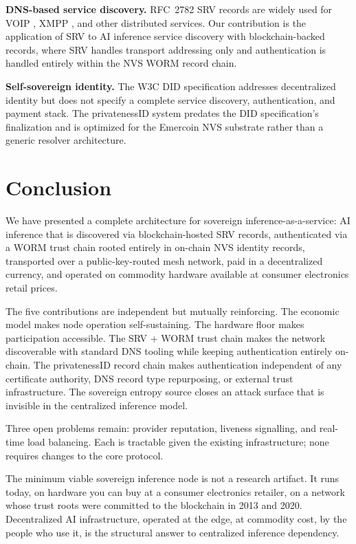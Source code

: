 \documentclass[11pt,a4paper]{article}
\theoremstyle{definition}
\begin{document}
\textbf{DNS-based service discovery.}  RFC~2782 SRV records are widely used
for VOIP \cite{sip}, XMPP \cite{xmpp}, and other distributed services.
Our contribution is the application of SRV to AI inference service discovery
with blockchain-backed records, where SRV handles transport addressing only
and authentication is handled entirely within the NVS WORM record chain.

\textbf{Self-sovereign identity.}  The W3C DID specification \cite{w3cdid}
addresses decentralized identity but does not specify a complete service
discovery, authentication, and payment stack.  The privatenessID system
predates the DID specification's finalization and is optimized for the
Emercoin NVS substrate rather than a generic resolver architecture.

\section{Conclusion}
\label{sec:conclusion}

We have presented a complete architecture for sovereign inference-as-a-service:
AI inference that is discovered via blockchain-hosted SRV records, authenticated
via a WORM trust chain rooted entirely in on-chain NVS identity records,
transported over a public-key-routed mesh network, paid in a decentralized
currency, and operated on commodity hardware available at consumer electronics retail prices.

The five contributions are independent but mutually reinforcing.  The
economic model makes node operation self-sustaining.  The hardware floor
makes participation accessible.  The SRV + WORM trust chain makes the
network discoverable with standard DNS tooling while keeping authentication
entirely on-chain.  The privatenessID record chain makes authentication
independent of any certificate authority, DNS record type repurposing,
or external trust infrastructure.
The sovereign entropy source closes an attack surface that is invisible
in the centralized inference model.

Three open problems remain: provider reputation, liveness signalling, and
real-time load balancing.  Each is tractable given the existing infrastructure;
none requires changes to the core protocol.

The minimum viable sovereign inference node is not a research artifact.
It runs today, on hardware you can buy at a consumer electronics retailer,
on a network whose trust roots were committed to the blockchain in 2013 and
2020.  Decentralized AI infrastructure, operated at the edge, at commodity
cost, by the people who use it, is the structural answer to centralized
inference dependency.
\end{document}
